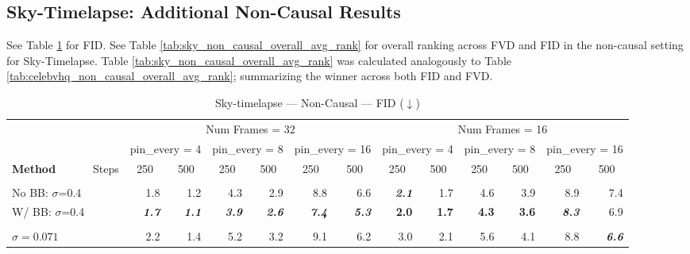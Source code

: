 \subsection{Sky-Timelapse: Additional Non-Causal Results}

See Table \ref{tab:sky_NON_causal_fid} for FID. See Table \ref{tab:sky_non_causal_overall_avg_rank} for overall ranking across FVD and FID in the non-causal setting for Sky-Timelapse. Table \ref{tab:sky_non_causal_overall_avg_rank} was calculated analogously to Table \ref{tab:celebvhq_non_causal_overall_avg_rank}; summarizing the winner across both FID and FVD.

\begin{table}[hbp]
\centering\tiny
\caption{Sky-timelapse --- Non-Causal --- FID ($\downarrow$)}
\label{tab:sky_NON_causal_fid}
\begin{tabular}{lrrrrrrrrrrrr}
\toprule
 & \multicolumn{6}{c}{Num Frames = 32} & \multicolumn{6}{c}{Num Frames = 16} \\
\cmidrule(lr){2-7} \cmidrule(lr){8-13}
 & \multicolumn{2}{c}{pin\_every = 4} & \multicolumn{2}{c}{pin\_every = 8} & \multicolumn{2}{c}{pin\_every = 16} & \multicolumn{2}{c}{pin\_every = 4} & \multicolumn{2}{c}{pin\_every = 8} & \multicolumn{2}{c}{pin\_every = 16} \\
\cmidrule(lr){2-3} \cmidrule(lr){4-5} \cmidrule(lr){6-7} \cmidrule(lr){8-9} \cmidrule(lr){10-11} \cmidrule(lr){12-13}
\textbf{Method} \ \ \ \ \ \ Steps & \multicolumn{1}{c}{250} & \multicolumn{1}{c}{500} & \multicolumn{1}{c}{250} & \multicolumn{1}{c}{500} & \multicolumn{1}{c}{250} & \multicolumn{1}{c}{500} & \multicolumn{1}{c}{250} & \multicolumn{1}{c}{500} & \multicolumn{1}{c}{250} & \multicolumn{1}{c}{500} & \multicolumn{1}{c}{250} & \multicolumn{1}{c}{500} \\
\midrule
\rowcolor{gray!20} \multicolumn{13}{l}{\textit{ABC}} \\
\quad No BB: $\sigma$=0.4 & 1.8 & 1.2 & 4.3 & 2.9 & 8.8 & 6.6 & \textbf{\textit{2.1}} & 1.7 & 4.6 & 3.9 & 8.9 & 7.4 \\
\quad W/ BB: $\sigma$=0.4 & \textbf{\textit{1.7}} & \textbf{\textit{1.1}} & \textbf{\textit{3.9}} & \textbf{\textit{2.6}} & \textbf{\textit{7.4}} & \textbf{\textit{5.3}} & \textbf{2.0} & \textbf{1.7} & \textbf{4.3} & \textbf{3.6} & \textbf{\textit{8.3}} & 6.9 \\
\rowcolor{gray!20} \multicolumn{13}{l}{\textit{Conditional Diffusion Bridge}} \\
\quad $\sigma=0.071$ & 2.2 & 1.4 & 5.2 & 3.2 & 9.1 & 6.2 & 3.0 & 2.1 & 5.6 & 4.1 & 8.8 & \textbf{\textit{6.6}} \\

\end{tabular}
\end{table}
